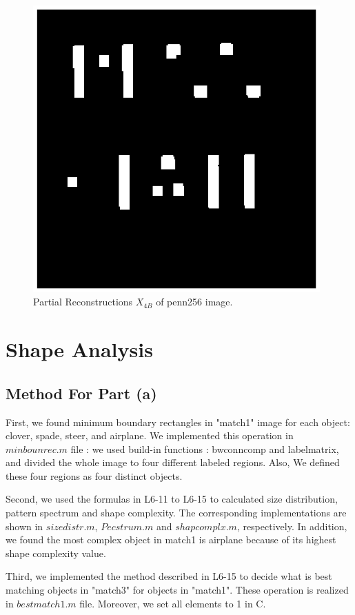 \documentclass[paper=a4, fontsize=11pt]{scrartcl}
\begin{document}
\begin{figure}
	\centering
	\includegraphics[width=11cm]{X4Bpenn.eps}
	\caption{Partial Reconstructions $X_{4B}$ of penn256 image.}
	\label{fig:14}
\end{figure}


\section{Shape Analysis}

\subsection{ Method For Part (a) }

First, we found minimum boundary rectangles in "match1" image for each object: clover, spade, steer, and airplane. We implemented this operation in $minbounrec.m$ file : we used build-in functions : bwconncomp and labelmatrix, and divided the whole image to four different labeled regions.  Also, We defined these four regions as four distinct objects. 

	Second, we used the formulas in L6-11 to L6-15 to calculated size distribution, pattern spectrum and shape complexity. The corresponding implementations are shown in $sizedistr.m$, $Pecstrum.m$ and $shapcomplx.m$, respectively. In addition, we found the most complex object in match1 is airplane because of its highest shape complexity value.

	Third, we implemented the method described in L6-15 to decide what is best matching objects in "match3"  for objects in "match1". These operation is realized in $bestmatch1.m$ file.  Moreover, we set all elements to 1 in C.
\end{document}
